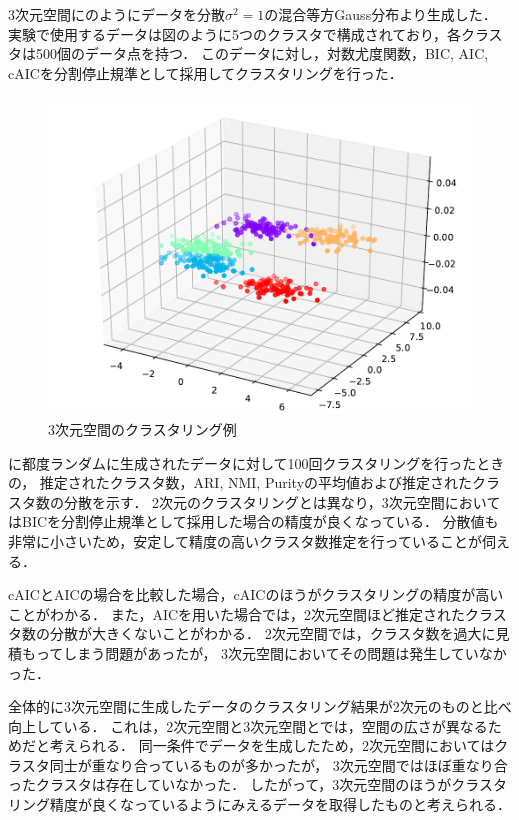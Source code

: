 3次元空間にのようにデータを分散$\sigma^2=1$の混合等方Gauss分布より生成した．
実験で使用するデータは図のように5つのクラスタで構成されており，各クラスタは500個のデータ点を持つ．
このデータに対し，対数尤度関数，BIC, AIC, cAICを分割停止規準として採用してクラスタリングを行った．

\begin{figure}[htbp]
  \begin{center}
    \includegraphics[width=0.7\linewidth]{./img/BIC_3.pdf}
      \caption{3次元空間のクラスタリング例}
      \label{fig:3dim}
  \end{center}
\end{figure}

に都度ランダムに生成されたデータに対して100回クラスタリングを行ったときの，
推定されたクラスタ数，ARI, NMI, Purityの平均値および推定されたクラスタ数の分散を示す．
2次元のクラスタリングとは異なり，3次元空間においてはBICを分割停止規準として採用した場合の精度が良くなっている．
分散値も非常に小さいため，安定して精度の高いクラスタ数推定を行っていることが伺える．

cAICとAICの場合を比較した場合，cAICのほうがクラスタリングの精度が高いことがわかる．
また，AICを用いた場合では，2次元空間ほど推定されたクラスタ数の分散が大きくないことがわかる．
2次元空間では，クラスタ数を過大に見積もってしまう問題があったが，
3次元空間においてその問題は発生していなかった．

全体的に3次元空間に生成したデータのクラスタリング結果が2次元のものと比べ向上している．
これは，2次元空間と3次元空間とでは，空間の広さが異なるためだと考えられる．
同一条件でデータを生成したため，2次元空間においてはクラスタ同士が重なり合っているものが多かったが，
3次元空間ではほぼ重なり合ったクラスタは存在していなかった．
したがって，3次元空間のほうがクラスタリング精度が良くなっているようにみえるデータを取得したものと考えられる．

